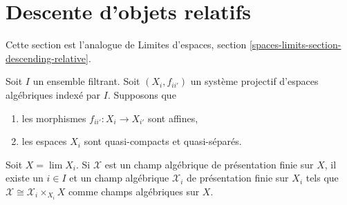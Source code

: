 \section{Descente d'objets relatifs}
\label{section-descending-relative}

\noindent
Cette section est l'analogue de Limites d'espaces, section
\ref{spaces-limits-section-descending-relative}.

\begin{lemma}
\label{lemma-descend-a-stack-down}
Soit $I$ un ensemble filtrant. Soit $(X_i, f_{ii'})$ un système projectif
d'espaces algébriques indexé par $I$. Supposons que
\begin{enumerate}
\item les morphismes $f_{ii'} : X_i \to X_{i'}$ sont affines,
\item les espaces $X_i$ sont quasi-compacts et quasi-séparés.
\end{enumerate}
Soit $X = \lim X_i$. Si $\mathcal{X}$ est un champ algébrique de présentation
finie sur $X$, il existe un $i \in I$ et un champ algébrique $\mathcal{X}_i$
de présentation finie sur $X_i$ tels que
$\mathcal{X} \cong \mathcal{X}_i \times_{X_i} X$ comme champs algébriques sur
$X$.
\end{lemma}

